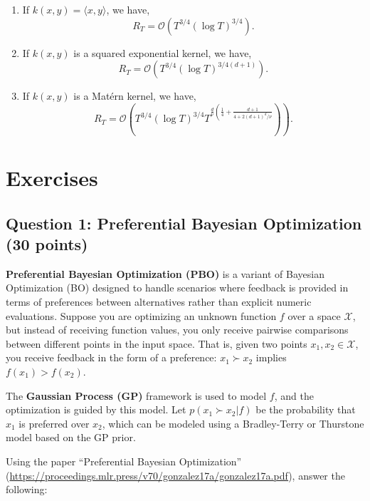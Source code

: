 \documentclass[
  letterpaper,
  numbers=noenddot,
  DIV=11]{scrreprt}
\theoremstyle{definition}
\theoremstyle{plain}
\theoremstyle{plain}
\theoremstyle{remark}
\begin{document}
\begin{enumerate}
\def\labelenumi{\arabic{enumi}.}
\item
  If \(k(x, y)=\langle x, y\rangle\), we have,
  \[R_T=\mathcal{O}\left(T^{3 / 4}(\log T)^{3 / 4}\right) .\]
\item
  If \(k(x, y)\) is a squared exponential kernel, we have,
  \[R_T=\mathcal{O}\left(T^{3 / 4}(\log T)^{3 / 4(d+1)}\right) .\]
\item
  If \(k(x, y)\) is a Matérn kernel, we have,
  \[\left.R_T=\mathcal{O}\left(T^{3 / 4}(\log T)^{3 / 4} T^{\frac{d}{\nu}\left(\frac{1}{4}+\frac{d+1}{4+2(d+1)^d / \nu}\right.}\right)\right).\]
\end{enumerate}

\section{Exercises}\label{exercises-2}

\subsection*{Question 1: Preferential Bayesian Optimization (30
points)}\label{sec-question-1-preferential-bayesian-optimization-30-points}

\textbf{Preferential Bayesian Optimization (PBO)} is a variant of
Bayesian Optimization (BO) designed to handle scenarios where feedback
is provided in terms of preferences between alternatives rather than
explicit numeric evaluations. Suppose you are optimizing an unknown
function \(f\) over a space \(\mathcal{X}\), but instead of receiving
function values, you only receive pairwise comparisons between different
points in the input space. That is, given two points
\(x_1, x_2 \in \mathcal{X}\), you receive feedback in the form of a
preference: \(x_1 \succ x_2\) implies \(f(x_1) > f(x_2)\).

The \textbf{Gaussian Process (GP)} framework is used to model \(f\), and
the optimization is guided by this model. Let \(p(x_1 \succ x_2 | f)\)
be the probability that \(x_1\) is preferred over \(x_2\), which can be
modeled using a Bradley-Terry or Thurstone model based on the GP prior.

Using the paper ``Preferential Bayesian Optimization''
(\url{https://proceedings.mlr.press/v70/gonzalez17a/gonzalez17a.pdf}),
answer the following:
\end{document}
